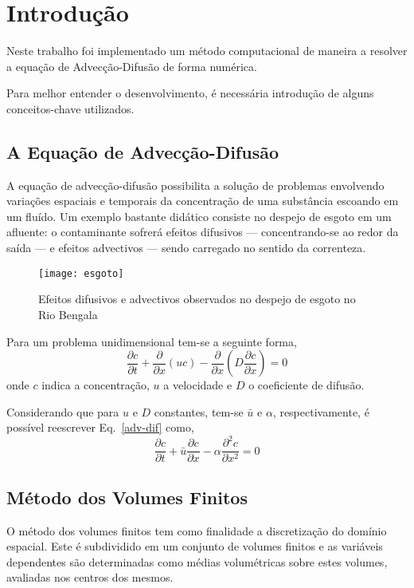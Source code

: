\chapter{Introdução}
Neste trabalho foi implementado um método computacional de maneira a resolver
a equação de Advecção-Difusão de forma numérica.

Para melhor entender o desenvolvimento, é necessária introdução de alguns
conceitos-chave utilizados.

\section{A Equação de Advecção-Difusão}
A equação de advecção-difusão possibilita a solução de problemas envolvendo
variações espaciais e temporais da concentração de uma substância escoando em um
fluído. Um exemplo bastante didático consiste no despejo de esgoto em um
afluente: o contaminante sofrerá efeitos difusivos --- concentrando-se ao redor
da saída --- e efeitos advectivos --- sendo carregado no sentido da correnteza.
\begin{figure}[h]
    \centering
    \captionsetup{justification=centering}
    \texttt{[image: esgoto]}
    \caption{Efeitos difusivos e advectivos observados no despejo de esgoto no
    Rio Bengala}
\end{figure}

Para um problema unidimensional tem-se a seguinte forma,
\begin{equation}\label{adv-dif}
    \frac{\partial c}{\partial t} + \frac{\partial}{\partial x}(uc)
    - \frac{\partial}{\partial x}\left( D \frac{\partial c}{\partial x} \right)
    = 0
\end{equation}
onde $c$ indica a concentração, $u$ a velocidade e $D$ o coeficiente de difusão.

Considerando que para $u$ e $D$ constantes, tem-se $\bar{u}$ e $\alpha$,
respectivamente, é possível reescrever Eq.\ \ref{adv-dif} como,
\begin{equation}
    \frac{\partial c}{\partial t} + \bar{u}\frac{\partial c}{\partial x} -
    \alpha\frac{\partial^2 c}{\partial x^2} = 0
\end{equation}

\section{Método dos Volumes Finitos}
O método dos volumes finitos tem como finalidade a discretização do domínio
espacial. Este é subdividido em um conjunto de volumes finitos e as variáveis
dependentes são determinadas como médias volumétricas sobre estes volumes,
avaliadas nos centros dos mesmos.

